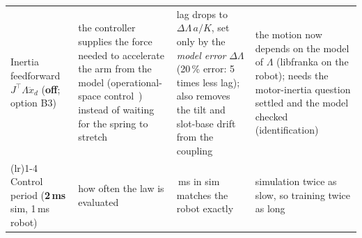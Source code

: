 \begin{center}
{\begin{tabular}{>{\raggedright\arraybackslash}p{}>{\raggedright\arraybackslash}p{}>{\raggedright\arraybackslash}p{}>{\raggedright\arraybackslash}p{}}
  Inertia feedforward \newline $J^\top\Lambda\ddot x_d$ \newline (\textbf{off}; option B3)
    & the controller supplies the force needed to accelerate the arm from the model (operational-space
      control~\cite{al-khatib1987}) instead of waiting for the spring to stretch
    & lag drops to $\Delta\Lambda\, a / K$, set only by the \emph{model error} $\Delta\Lambda$ (20\,\% error: 5 times less
      lag); also removes the tilt and slot-base drift from the coupling
    & the motion now depends on the model of $\Lambda$ (libfranka on the robot); needs the motor-inertia question
      settled and the model checked (identification) \\
  \addlinespace\cmidrule(lr){1-4}\addlinespace
  Control period \newline (\textbf{2\,ms} sim, 1\,ms robot)
    & how often the law is evaluated
    & 1\,ms in sim matches the robot exactly
    & simulation twice as slow, so training twice as long \\
  \bottomrule
\end{tabular}}
\end{center}

\clearpage
